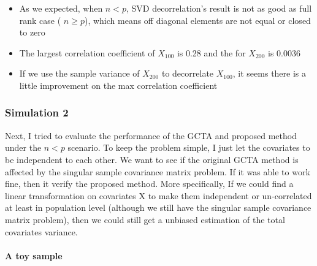 \documentclass[]{article}
\newenvironment{Shaded}{\begin{snugshade}}{\end{snugshade}}
\newcommand{\KeywordTok}[1]{\textcolor[rgb]{0.13,0.29,0.53}{\textbf{#1}}}
\newcommand{\DecValTok}[1]{\textcolor[rgb]{0.00,0.00,0.81}{#1}}
\newcommand{\FloatTok}[1]{\textcolor[rgb]{0.00,0.00,0.81}{#1}}
\newcommand{\StringTok}[1]{\textcolor[rgb]{0.31,0.60,0.02}{#1}}
\newcommand{\OtherTok}[1]{\textcolor[rgb]{0.56,0.35,0.01}{#1}}
\newcommand{\OperatorTok}[1]{\textcolor[rgb]{0.81,0.36,0.00}{\textbf{#1}}}
\newcommand{\NormalTok}[1]{#1}
\providecommand{\tightlist}{%
  \setlength{\itemsep}{0pt}\setlength{\parskip}{0pt}}
\let\oldparagraph\paragraph
\renewcommand{\paragraph}[1]{\oldparagraph{#1}\mbox{}}
\begin{document}
\begin{itemize}
\tightlist
\item
  As we expected, when \(n < p\), SVD decorrelation's result is not as
  good as full rank case ( \(n\geq p\)), which means off diagonal
  elements are not equal or closed to zero
\item
  The largest correlation coefficient of \(X_{100}\) is 0.28 and the for
  \(X_{200}\) is 0.0036
\item
  If we use the sample variance of \(X_{200}\) to decorrelate
  \(X_{100}\), it seems there is a little improvement on the max
  correlation coefficient
\end{itemize}

\subsubsection{Simulation 2}\label{simulation-2}

Next, I tried to evaluate the performance of the GCTA and proposed
method under the \(n < p\) scenario. To keep the problem simple, I just
let the covariates to be independent to each other. We want to see if
the original GCTA method is affected by the singular sample covariance
matrix problem. If it was able to work fine, then it verify the proposed
method. More specifically, If we could find a linear transformation on
covariates X to make them independent or un-correlated at least in
population level (although we still have the singular sample covariance
matrix problem), then we could still get a unbiased estimation of the
total covariates variance.

\paragraph{A toy sample}\label{a-toy-sample}

\begin{Shaded}
\end{Shaded}
\end{document}
